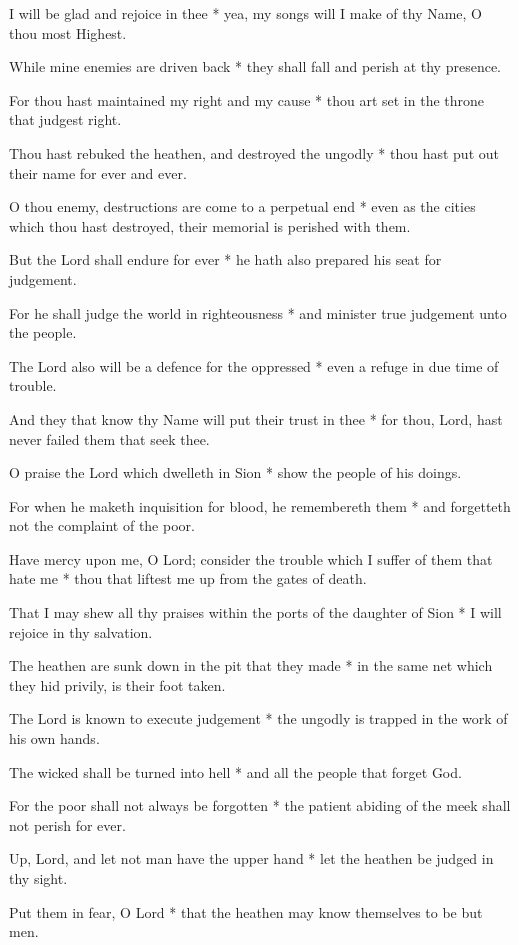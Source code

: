 I will be glad and rejoice in thee * yea, my songs will I make of thy Name, O thou most Highest.

While mine enemies are driven back * they shall fall and perish at thy presence.

For thou hast maintained my right and my cause * thou art set in the throne that judgest right.

Thou hast rebuked the heathen, and destroyed the ungodly * thou hast put out their name for ever and ever.

O thou enemy, destructions are come to a perpetual end * even as the cities which thou hast destroyed, their memorial is perished with them.

But the Lord shall endure for ever * he hath also prepared his seat for judgement.

For he shall judge the world in righteousness * and minister true judgement unto the people.

The Lord also will be a defence for the oppressed * even a refuge in due time of trouble.

And they that know thy Name will put their trust in thee * for thou, Lord, hast never failed them that seek thee.

O praise the Lord which dwelleth in Sion * show the people of his doings.

For when he maketh inquisition for blood, he remembereth them * and forgetteth not the complaint of the poor.

Have mercy upon me, O Lord; consider the trouble which I suffer of them that hate me * thou that liftest me up from the gates of death.

That I may shew all thy praises within the ports of the daughter of Sion * I will rejoice in thy salvation.

The heathen are sunk down in the pit that they made * in the same net which they hid privily, is their foot taken.

The Lord is known to execute judgement * the ungodly is trapped in the work of his own hands.

The wicked shall be turned into hell * and all the people that forget God.

For the poor shall not always be forgotten * the patient abiding of the meek shall not perish for ever.

Up, Lord, and let not man have the upper hand * let the heathen be judged in thy sight.

Put them in fear, O Lord * that the heathen may know themselves to be but men.


